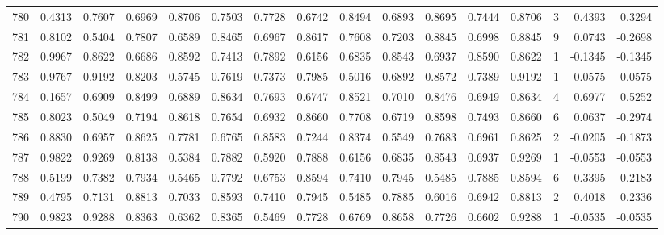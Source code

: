 \begin{tabular}{lrrrrrrrrrrrrrrr}
780 &      0.4313 &  0.7607 &  0.6969 &  0.8706 &  0.7503 &  0.7728 &  0.6742 &  0.8494 &  0.6893 &  0.8695 &   0.7444 &     0.8706 &      3 &                    0.4393 &                     0.3294 \\
781 &      0.8102 &  0.5404 &  0.7807 &  0.6589 &  0.8465 &  0.6967 &  0.8617 &  0.7608 &  0.7203 &  0.8845 &   0.6998 &     0.8845 &      9 &                    0.0743 &                    -0.2698 \\
782 &      0.9967 &  0.8622 &  0.6686 &  0.8592 &  0.7413 &  0.7892 &  0.6156 &  0.6835 &  0.8543 &  0.6937 &   0.8590 &     0.8622 &      1 &                   -0.1345 &                    -0.1345 \\
783 &      0.9767 &  0.9192 &  0.8203 &  0.5745 &  0.7619 &  0.7373 &  0.7985 &  0.5016 &  0.6892 &  0.8572 &   0.7389 &     0.9192 &      1 &                   -0.0575 &                    -0.0575 \\
784 &      0.1657 &  0.6909 &  0.8499 &  0.6889 &  0.8634 &  0.7693 &  0.6747 &  0.8521 &  0.7010 &  0.8476 &   0.6949 &     0.8634 &      4 &                    0.6977 &                     0.5252 \\
785 &      0.8023 &  0.5049 &  0.7194 &  0.8618 &  0.7654 &  0.6932 &  0.8660 &  0.7708 &  0.6719 &  0.8598 &   0.7493 &     0.8660 &      6 &                    0.0637 &                    -0.2974 \\
786 &      0.8830 &  0.6957 &  0.8625 &  0.7781 &  0.6765 &  0.8583 &  0.7244 &  0.8374 &  0.5549 &  0.7683 &   0.6961 &     0.8625 &      2 &                   -0.0205 &                    -0.1873 \\
787 &      0.9822 &  0.9269 &  0.8138 &  0.5384 &  0.7882 &  0.5920 &  0.7888 &  0.6156 &  0.6835 &  0.8543 &   0.6937 &     0.9269 &      1 &                   -0.0553 &                    -0.0553 \\
788 &      0.5199 &  0.7382 &  0.7934 &  0.5465 &  0.7792 &  0.6753 &  0.8594 &  0.7410 &  0.7945 &  0.5485 &   0.7885 &     0.8594 &      6 &                    0.3395 &                     0.2183 \\
789 &      0.4795 &  0.7131 &  0.8813 &  0.7033 &  0.8593 &  0.7410 &  0.7945 &  0.5485 &  0.7885 &  0.6016 &   0.6942 &     0.8813 &      2 &                    0.4018 &                     0.2336 \\
790 &      0.9823 &  0.9288 &  0.8363 &  0.6362 &  0.8365 &  0.5469 &  0.7728 &  0.6769 &  0.8658 &  0.7726 &   0.6602 &     0.9288 &      1 &                   -0.0535 &                    -0.0535 \\

\end{tabular}
